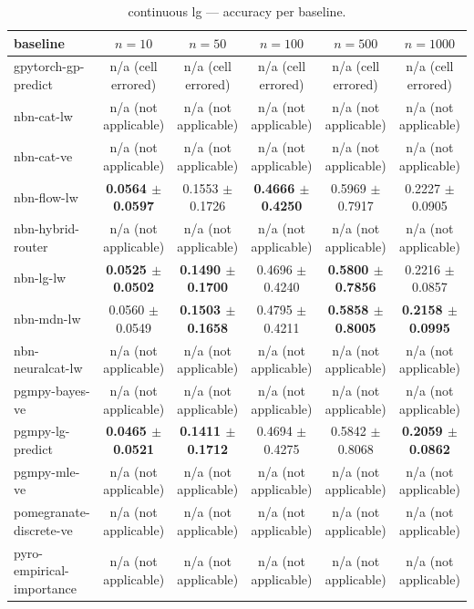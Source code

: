 
\begin{table}[h]
\centering
\caption{continuous lg — accuracy per baseline.}
\label{tab:continuous_lg_accuracy}
\begin{tabular}{lccccc}
\toprule
baseline & $n=10$ & $n=50$ & $n=100$ & $n=500$ & $n=1000$ \\
\midrule
gpytorch-gp-predict & n/a (cell errored) & n/a (cell errored) & n/a (cell errored) & n/a (cell errored) & n/a (cell errored) \\
nbn-cat-lw & n/a (not applicable) & n/a (not applicable) & n/a (not applicable) & n/a (not applicable) & n/a (not applicable) \\
nbn-cat-ve & n/a (not applicable) & n/a (not applicable) & n/a (not applicable) & n/a (not applicable) & n/a (not applicable) \\
nbn-flow-lw & \textbf{0.0564 $\pm$ 0.0597} & 0.1553 $\pm$ 0.1726 & \textbf{0.4666 $\pm$ 0.4250} & 0.5969 $\pm$ 0.7917 & 0.2227 $\pm$ 0.0905 \\
nbn-hybrid-router & n/a (not applicable) & n/a (not applicable) & n/a (not applicable) & n/a (not applicable) & n/a (not applicable) \\
nbn-lg-lw & \textbf{0.0525 $\pm$ 0.0502} & \textbf{0.1490 $\pm$ 0.1700} & 0.4696 $\pm$ 0.4240 & \textbf{0.5800 $\pm$ 0.7856} & 0.2216 $\pm$ 0.0857 \\
nbn-mdn-lw & 0.0560 $\pm$ 0.0549 & \textbf{0.1503 $\pm$ 0.1658} & 0.4795 $\pm$ 0.4211 & \textbf{0.5858 $\pm$ 0.8005} & \textbf{0.2158 $\pm$ 0.0995} \\
nbn-neuralcat-lw & n/a (not applicable) & n/a (not applicable) & n/a (not applicable) & n/a (not applicable) & n/a (not applicable) \\
pgmpy-bayes-ve & n/a (not applicable) & n/a (not applicable) & n/a (not applicable) & n/a (not applicable) & n/a (not applicable) \\
pgmpy-lg-predict & \textbf{0.0465 $\pm$ 0.0521} & \textbf{0.1411 $\pm$ 0.1712} & 0.4694 $\pm$ 0.4275 & 0.5842 $\pm$ 0.8068 & \textbf{0.2059 $\pm$ 0.0862} \\
pgmpy-mle-ve & n/a (not applicable) & n/a (not applicable) & n/a (not applicable) & n/a (not applicable) & n/a (not applicable) \\
pomegranate-discrete-ve & n/a (not applicable) & n/a (not applicable) & n/a (not applicable) & n/a (not applicable) & n/a (not applicable) \\
pyro-empirical-importance & n/a (not applicable) & n/a (not applicable) & n/a (not applicable) & n/a (not applicable) & n/a (not applicable) \\
\bottomrule
\end{tabular}
\end{table}

